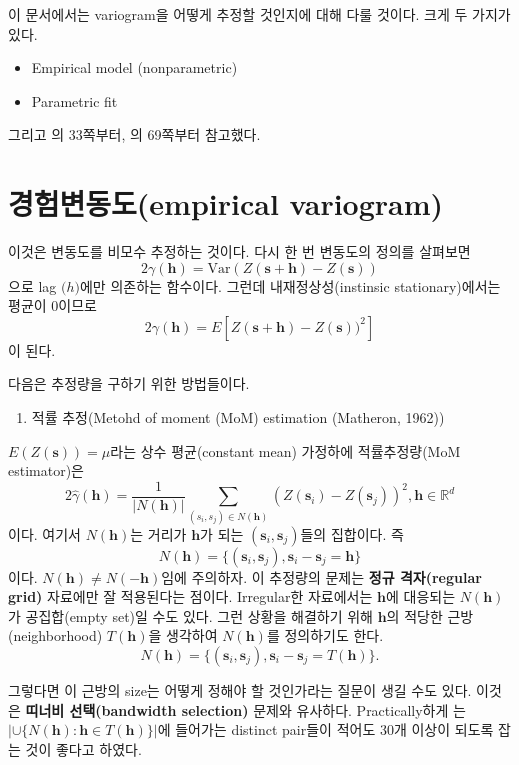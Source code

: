 \documentclass[b5paper,]{scrbook}
\providecommand{\tightlist}{%
  \setlength{\itemsep}{0pt}\setlength{\parskip}{0pt}}
\theoremstyle{plain}
\theoremstyle{definition}
\numberwithin{equation}{section}
\begin{document}
이 문서에서는 variogram을 어떻게 추정할 것인지에 대해 다룰 것이다. 크게
두 가지가 있다.

\begin{itemize}
\item
  Empirical model (nonparametric)
\item
  Parametric fit
\end{itemize}

그리고 \citep{Gelfand2010}의 33쪽부터, \citep{Cressie1993}의 69쪽부터
참고했다.

\section{경험변동도(empirical variogram)}\label{empirical-variogram}

이것은 변동도를 비모수 추정하는 것이다. 다시 한 번 변동도의 정의를
살펴보면
\[2\gamma(\mathbf{h})=\text{Var}(Z(\mathbf{s}+\mathbf{h})-Z(\mathbf{s}))\]
으로 lag \(\mathbf(h)\)에만 의존하는 함수이다. 그런데
내재정상성(instinsic stationary)에서는 평균이 0이므로
\[2\gamma(\mathbf{h})=E[Z(\mathbf{s}+\mathbf{h})-Z(\mathbf{s}))^{2}]\]
이 된다.

다음은 추정량을 구하기 위한 방법들이다.

\begin{enumerate}
\def\labelenumi{\arabic{enumi}.}
\tightlist
\item
  적률 추정(Metohd of moment (MoM) estimation (Matheron, 1962))
\end{enumerate}

\(E(Z(\mathbf{s}))=\mu\)라는 상수 평균(constant mean) 가정하에
적률추정량(MoM estimator)은
\[2\hat{\gamma}(\mathbf{h})=\frac{1}{|N(\mathbf{h})|}\sum_{(s_{i},s_{j})\in N(\mathbf{h})}(Z(\mathbf{s}_{i})-Z(\mathbf{s}_{j}))^{2}, \mathbf{h}\in \mathbb{R}^{d}\]
이다. 여기서 \(N(\mathbf{h})\)는 거리가 \(\mathbf{h}\)가 되는
\((\mathbf{s}_{i},\mathbf{s}_{j})\)들의 집합이다. 즉
\[N(\mathbf{h})=\{ (\mathbf{s}_{i},\mathbf{s}_{j}), \mathbf{s}_{i}-\mathbf{s}_{j}=\mathbf{h} \}\]
이다. \(N(\mathbf{h}) \neq N(\mathbf{-h})\)임에 주의하자. 이 추정량의
문제는 \textbf{정규 격자(regular grid)} 자료에만 잘 적용된다는 점이다.
Irregular한 자료에서는 \(\mathbf{h}\)에 대응되는 \(N(\mathbf{h})\)가
공집합(empty set)일 수도 있다. 그런 상황을 해결하기 위해
\(\mathbf{h}\)의 적당한 근방(neighborhood) \(T(\mathbf{h})\)을 생각하여
\(N(\mathbf{h})\)를 정의하기도 한다.
\[N(\mathbf{h})=\{ (\mathbf{s}_{i},\mathbf{s}_{j}), \mathbf{s}_{i}-\mathbf{s}_{j}=T(\mathbf{h}) \} .\]

그렇다면 이 근방의 size는 어떻게 정해야 할 것인가라는 질문이 생길 수도
있다. 이것은 \textbf{띠너비 선택(bandwidth selection)} 문제와 유사하다.
Practically하게 \citep{Journel2003}는
\(| \cup \{N(\mathbf{h}): \mathbf{h} \in T(\mathbf{h}) \} |\)에 들어가는
distinct pair들이 적어도 30개 이상이 되도록 잡는 것이 좋다고 하였다.
\end{document}
